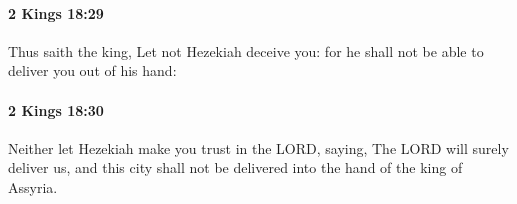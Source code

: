 		\paragraph{2 Kings 18:29} %
			\label{2KINGS-18-29}

			Thus saith the king, Let not Hezekiah deceive you: for he shall not be able to deliver you out of his hand:


		\paragraph{2 Kings 18:30} %
			\label{2KINGS-18-30}

			Neither let Hezekiah make you trust in the LORD, saying, The LORD will surely deliver us, and this city shall not be delivered into the hand of the king of Assyria.


